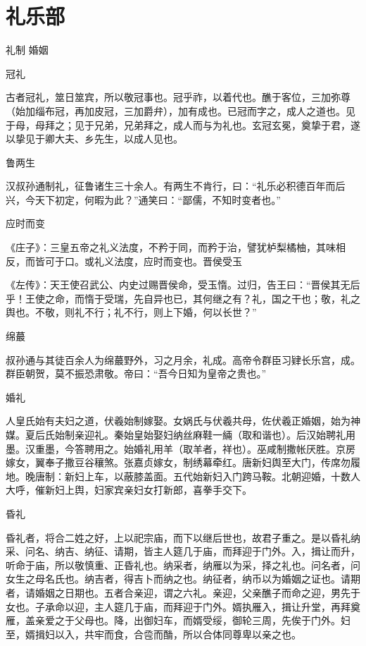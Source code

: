 \documentclass[a4paper,12pt,UTF8,twoside]{ctexbook}
\begin{document}
    
    
    \part{礼乐部}
    
    礼制 婚姻
    
    冠礼
    
    古者冠礼，筮日筮宾，所以敬冠事也。冠乎祚，以着代也。醮于客位，三加弥尊（始加缁布冠，再加皮冠，三加爵弁），加有成也。已冠而字之，成人之道也。见于母，母拜之；见于兄弟，兄弟拜之，成人而与为礼也。玄冠玄冕，奠挚于君，遂以挚见于卿大夫、乡先生，以成人见也。
    
    鲁两生
    
    汉叔孙通制礼，征鲁诸生三十余人。有两生不肯行，曰：“礼乐必积德百年而后兴，今天下初定，何暇为此？”通笑曰：“鄙儒，不知时变者也。”
    
    应时而变
    
    《庄子》：三皇五帝之礼义法度，不矜于同，而矜于治，譬犹栌梨橘柚，其味相反，而皆可于口。或礼义法度，应时而变也。晋侯受玉
    
    《左传》：天王使召武公、内史过赐晋侯命，受玉惰。过归，告王曰：“晋侯其无后乎！王使之命，而惰于受瑞，先自异也已，其何继之有？礼，国之干也；敬，礼之舆也。不敬，则礼不行；礼不行，则上下婚，何以长世？”
    
    绵蕞
    
    叔孙通与其徒百余人为绵蕞野外，习之月余，礼成。高帝令群臣习肄长乐宫，成。群臣朝贺，莫不振恐肃敬。帝曰：“吾今日知为皇帝之贵也。”
    
    婚礼
    
    人皇氏始有夫妇之道，伏羲始制嫁娶。女娲氏与伏羲共母，佐伏羲正婚姻，始为神媒。夏后氏始制亲迎礼。秦始皇始娶妇纳丝麻鞋一緉（取和谐也）。后汉始聘礼用墨。汉重墨，今答聘用之。始婚礼用羊（取羊者，祥也）。巫咸制撒帐厌胜。京房嫁女，翼奉子撒豆谷穰煞。张嘉贞嫁女，制绣幕牵红。唐新妇舆至大门，传席勿履地。晚唐制：新妇上车，以蔽膝盖面。五代始新妇入门跨马鞍。北朝迎婚，十数人大呼，催新妇上舆，妇家宾亲妇女打新郎，喜拳手交下。
    
    昏礼
    
    昏礼者，将合二姓之好，上以祀宗庙，而下以继后世也，故君子重之。是以昏礼纳采、问名、纳吉、纳征、请期，皆主人筵几于庙，而拜迎于门外。入，揖让而升，听命于庙，所以敬慎重、正昏礼也。纳采者，纳雁以为采，择之礼也。问名者，问女生之母名氏也。纳吉者，得吉卜而纳之也。纳征者，纳币以为婚姻之证也。请期者，请婚姻之日期也。五者合亲迎，谓之六礼。亲迎，父亲醮子而命之迎，男先于女也。子承命以迎，主人筵几于庙，而拜迎于门外。婿执雁入，揖让升堂，再拜奠雁，盖亲爱之于父母也。降，出御妇车，而婿受绥，御轮三周，先俟于门外。妇至，婿揖妇以入，共牢而食，合卺而酳，所以合体同尊卑以亲之也。
    
\end{document}
